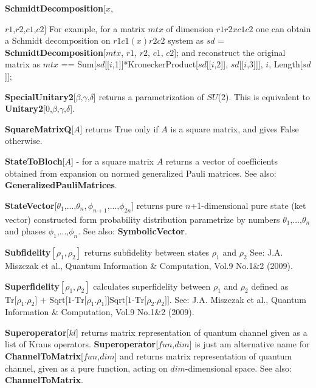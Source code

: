 \begin{itemize}
\indent{} \textbf{SchmidtDecomposition}[$x$,{{$r1$,$r2$},{$c1$,$c2$}]\newline{}
For example, for a matrix $mtx$ of dimension $r1 r2x c1 c2$ one can obtain a Schmidt decomposition on $r1 c1(x) r2 c2$ system as \newline{}
\indent{} $sd$ = \textbf{SchmidtDecomposition}[$mtx$, {{$r1$, $r2$}, {$c1$, $c2$}}];\newline{}
and reconstruct the original matrix as\newline{}
\indent{} $mtx$ == Sum[$sd$[[$i$,1]]*KroneckerProduct[$sd$[[$i$,2]], $sd$[[$i$,3]]], {$i$, Length[$sd$]}];
\item  \textbf{SpecialUnitary2}[$\text{$\beta $,$\gamma $,$\delta $}$] returns a parametrization of $SU$(2). This is equivalent to \textbf{Unitary2}[$\text{0,$\beta $,$\gamma $,$\delta $}$].
\item  \textbf{SquareMatrixQ}[$A$] returns True only if $A$ is a square matrix, and gives False otherwise.
\item  \textbf{StateToBloch}[$A$] - for a square matrix $A$ returns a vector of coefficients obtained from expansion on normed generalized Pauli matrices. See also: \textbf{GeneralizedPauliMatrices}.
\item  \textbf{StateVector}[{$\theta _1\text{,...,}\theta _n,\phi _{n+1}\text{,...,}\phi _{2 n}$}] returns pure $n$+1-dimensional pure state (ket vector) constructed form probability distribution parametrize by numbers {$\theta _1\text{,...,}\theta _n$} and phases {$\phi _1\text{,...,}\phi _n$}. See also: \textbf{SymbolicVector}.
\item  \textbf{Subfidelity}$\left[\rho _1,\rho _2\right]$ returns subfidelity between states $\rho _1$ and $\rho _2$ See: J.A. Miszczak et al., Quantum Information \& Computation, Vol.9 No.1\&2 (2009).
\item  \textbf{Superfidelity}$\left[\rho _1,\rho _2\right]$ calculates superfidelity between $\rho _1$ and $\rho _2$ defined as $\text{Tr[}\rho _1.\rho _2\text{] + Sqrt[1-Tr[}\rho _1.\rho _1\text{]]Sqrt[1-Tr[}\rho _2.\rho _2\text{]]}$. See: J.A. Miszczak et al., Quantum Information \& Computation, Vol.9 No.1\&2 (2009).
\item  \textbf{Superoperator}[$kl$] returns matrix representation of quantum channel given as a list of Kraus operators. \textbf{Superoperator}[$fun$,$dim$] is just am alternative name for \textbf{ChannelToMatrix}[$fun$,$dim$] and returns matrix representation of quantum channel, given as a pure function, acting on $dim$-dimensional space. See also: \textbf{ChannelToMatrix}.
}
\end{itemize}
